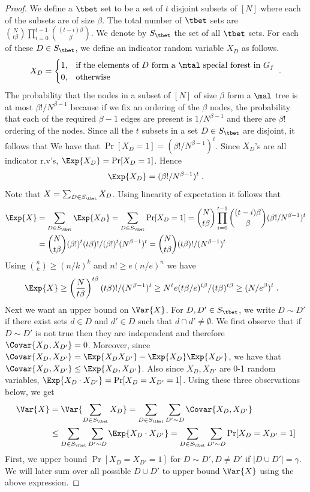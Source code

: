 \begin{proof}
We define a $\tbet$ set to be a set of $t$ disjoint subsets of $[N]$ where each of the subsets are of size $\beta$. The total number of $\tbet$ sets are $\binom{N}{t\beta}\prod_{i=0}^{t-1}\binom{(t-i)\beta}{\beta}$. We denote by $S_\tbet$ the set of all $\tbet$ sets. For each of these $D\in S_\tbet$, we define an indicator random variable $X_D$ as follows.
\[
X_D=\begin{cases}
    1, & \text{if the elements of $D$ form a $\mtal$ special forest in }G_f\\
    0, & \text{otherwise}
\end{cases}\;.   
\]
The probability that the nodes in a subset of $[N]$ of size $\beta$ form a $\mal$ tree is at most $\beta!/N^{\beta-1}$ because if we fix an ordering of the $\beta$ nodes, the probability that each of the required $\beta-1$ edges are present is $1/N^{\beta-1}$ and there are $\beta!$ ordering of the nodes.
Since all the $t$ subsets in a set $D\in S_\tbet$ are disjoint, it follows that
We have that $\Pr[X_D=1]=(\beta!/N^{\beta-1})^t$.
Since $X_D$'s are all indicator r.v's, $\Exp{X_D}=\Pr[X_D=1]$. Hence
\[\Exp{X_D}=(\beta!/N^{\beta-1})^t\;.\]
Note that $X=\sum_{D \in S_\tbet}X_D$. Using linearity of expectation it follows that 
\begin{align*}
\Exp{X}&=\sum_{D\in S_\tbet}\Exp{X_D}= \sum_{D \in S_\tbet}\Pr[X_D=1]= \binom{N}{t\beta}\prod_{i=0}^{t-1}\binom{(t-i)\beta}{\beta}(\beta!/N^{\beta-1})^t\\
&=\binom{N}{t\beta}(\beta!)^t(t\beta)!/(\beta!)^t(N^{\beta-1})^t=\binom{N}{t\beta}(t\beta)!/(N^{\beta-1})^t
\end{align*}
Using $\binom{n}{k}\geq (n/k)^k$ and $n!\geq e(n/e)^n$ we have
\begin{align*}
    \Exp{X}& \geq \left(\frac{N}{t\beta}\right)^{t\beta}(t\beta)!/(N^{\beta-1})^t
        \geq N^t e(t\beta/e)^{t\beta}/(t\beta)^{t\beta}\geq (N/e^{\beta})^t\;.
\end{align*}
Next we want an upper bound on $\Var{X}$. 
For $D,D'\in S_\tbet$, we write $D\sim D'$ if there exist sets $d\in D$ and $d'\in D$ such that $d\cap d'\neq \emptyset$. We first observe that if $D\sim D'$ is not true then they are independent and therefore $\Covar{X_D,X_{D'}}=0$. Moreover, since $\Covar{X_D,X_{D'}}=\Exp{X_DX_{D'}}-\Exp{X_D}\Exp{X_{D'}}$, we have that $\Covar{X_D,X_{D'}}\leq \Exp{X_D,X_{D'}}$. Also since $X_D,X_{D'}$ are 0-1 random variables, $\Exp{X_D\cdot X_{D'}}=\Pr[X_D=X_{D'}=1]$.
Using these three observations below, we get
\begin{align*}
    \Var{X}&=\Var{\sum_{D\in S_\tbet}X_D}=\sum_{D\in S_\tbet}\sum_{D'\sim D} \Covar{X_D,X_{D'}}\\ &\leq \sum_{D\in S_\tbet}\sum_{D'\sim D} \Exp{X_D\cdot X_{D'}}= \sum_{D\in S_\tbet}\sum_{D'\sim D} \Pr[X_D=X_{D'}=1]
\end{align*}
First, we upper bound $\Pr[X_D=X_{D'}=1]$ for $D\sim D', D\neq D'$ if $|D\cup D'|=\gamma$.
We will later sum over all possible $D\cup D'$ to upper bound $\Var{X}$ using the above expression.


\end{proof}
